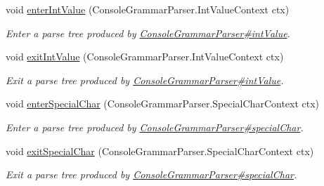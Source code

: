 \begin{DoxyCompactItemize}
void \hyperlink{interfacegov_1_1nasa_1_1jpf_1_1inspector_1_1client_1_1parser_1_1_console_grammar_listener_a859daf15e1fce916dbe783a1ffdd6884}{enter\+Int\+Value} (Console\+Grammar\+Parser.\+Int\+Value\+Context ctx)
\begin{DoxyCompactList}\small\item\em Enter a parse tree produced by \hyperlink{classgov_1_1nasa_1_1jpf_1_1inspector_1_1client_1_1parser_1_1_console_grammar_parser_a132b5d5236398d90d8d1e6b16dc0bd20}{Console\+Grammar\+Parser\#int\+Value}. \end{DoxyCompactList}\item 
void \hyperlink{interfacegov_1_1nasa_1_1jpf_1_1inspector_1_1client_1_1parser_1_1_console_grammar_listener_a728096d437925a2bc87e5e3816918e07}{exit\+Int\+Value} (Console\+Grammar\+Parser.\+Int\+Value\+Context ctx)
\begin{DoxyCompactList}\small\item\em Exit a parse tree produced by \hyperlink{classgov_1_1nasa_1_1jpf_1_1inspector_1_1client_1_1parser_1_1_console_grammar_parser_a132b5d5236398d90d8d1e6b16dc0bd20}{Console\+Grammar\+Parser\#int\+Value}. \end{DoxyCompactList}\item 
void \hyperlink{interfacegov_1_1nasa_1_1jpf_1_1inspector_1_1client_1_1parser_1_1_console_grammar_listener_a3db66300dcd3e340cb8195849325f6c6}{enter\+Special\+Char} (Console\+Grammar\+Parser.\+Special\+Char\+Context ctx)
\begin{DoxyCompactList}\small\item\em Enter a parse tree produced by \hyperlink{classgov_1_1nasa_1_1jpf_1_1inspector_1_1client_1_1parser_1_1_console_grammar_parser_ade082ae679f41cefb41bcb42544f08e5}{Console\+Grammar\+Parser\#special\+Char}. \end{DoxyCompactList}\item 
void \hyperlink{interfacegov_1_1nasa_1_1jpf_1_1inspector_1_1client_1_1parser_1_1_console_grammar_listener_af2fa7f4ac9c1b0235ab506607d29ae89}{exit\+Special\+Char} (Console\+Grammar\+Parser.\+Special\+Char\+Context ctx)
\begin{DoxyCompactList}\small\item\em Exit a parse tree produced by \hyperlink{classgov_1_1nasa_1_1jpf_1_1inspector_1_1client_1_1parser_1_1_console_grammar_parser_ade082ae679f41cefb41bcb42544f08e5}{Console\+Grammar\+Parser\#special\+Char}. \end{DoxyCompactList}\end{DoxyCompactItemize}


